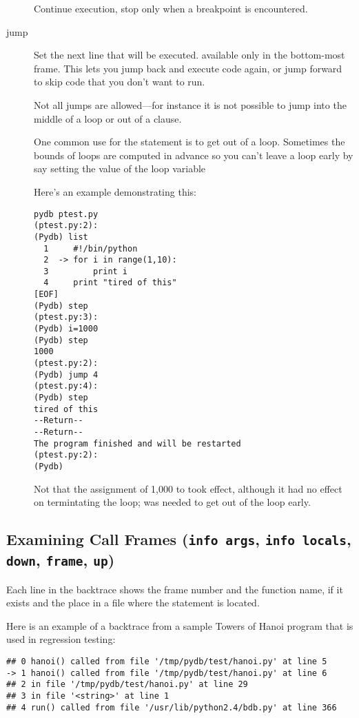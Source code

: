 \begin{description}
Continue execution, stop only when a breakpoint is encountered.

\item[jump \var{lineno}]

Set the next line that will be executed. available only in the
bottom-most frame.  This lets you jump back and execute code
again, or jump forward to skip code that you don't want to run.

Not all jumps are allowed---for instance it
is not possible to jump into the middle of a  loop or out
of a  clause.

One common use for the  statement is to get out of a
loop. Sometimes the bounds of loops are computed in advance so you
can't leave a loop early by say setting the value of the loop variable

Here's an example demonstrating this:

\begin{verbatim}
pydb ptest.py
(ptest.py:2): 
(Pydb) list
  1  	#!/bin/python
  2  ->	for i in range(1,10):
  3  	    print i
  4  	print "tired of this"
[EOF]
(Pydb) step
(ptest.py:3): 
(Pydb) i=1000
(Pydb) step
1000
(ptest.py:2): 
(Pydb) jump 4
(ptest.py:4): 
(Pydb) step
tired of this
--Return--
--Return--
The program finished and will be restarted
(ptest.py:2): 
(Pydb) 
\end{verbatim}

Not that the assignment of 1,000 to  took effect, although it
had no effect on termintating the  loop;  was
needed to get out of the loop early.

\end{description}

\subsection{Examining Call Frames ({\tt info args}, {\tt info
    locals}, {\tt down}, {\tt frame}, {\tt up})\label{subsection-frames}}

Each line in the backtrace shows the frame number and the function
name, if it exists and the place in a file where the statement is
located.

Here is an example of a backtrace from a sample Towers of Hanoi
program that is used in regression testing:

\begin{verbatim}
## 0 hanoi() called from file '/tmp/pydb/test/hanoi.py' at line 5
-> 1 hanoi() called from file '/tmp/pydb/test/hanoi.py' at line 6
## 2 in file '/tmp/pydb/test/hanoi.py' at line 29
## 3 in file '<string>' at line 1
## 4 run() called from file '/usr/lib/python2.4/bdb.py' at line 366
\end{verbatim}

